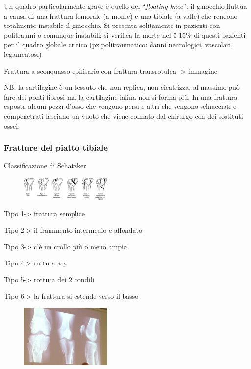 Un quadro particolarmente grave è quello del ``\emph{floating knee}'': il ginocchio fluttua a causa di una frattura femorale (a monte) e una tibiale (a valle) che rendono totalmente instabile il ginocchio. Si presenta solitamente in pazienti con politraumi o comunque instabili; si verifica la morte nel 5-15\% di questi pazienti per il quadro globale critico (pz politraumatico: danni neurologici, vascolari, legamentosi)

Frattura a sconquasso epifisario con frattura transrotulea -> immagine

NB: la cartilagine è un tessuto che non replica, non cicatrizza, al massimo può fare dei ponti fibrosi ma la cartilagine ialina non si forma più. In una frattura esposta alcuni pezzi d'osso che vengono persi e altri che vengono schiacciati e compenetrati lasciano un vuoto che viene colmato dal chirurgo con dei sostituti ossei.

\subsubsection{Fratture del piatto tibiale}

Classificazione di Schatzker

\begin{figure}[!ht]
\centering
\includegraphics[width=0.4\textwidth]{009/image10.jpeg}
\end{figure}

Tipo 1-> frattura semplice

Tipo 2-> il frammento intermedio è affondato

Tipo 3-> c'è un crollo più o meno ampio

Tipo 4-> rottura a y

Tipo 5-> rottura dei 2 condili

Tipo 6-> la frattura si estende verso il basso

\begin{figure}[!ht]
\centering
\includegraphics[width=0.4\textwidth]{009/image11.png}
\end{figure}

